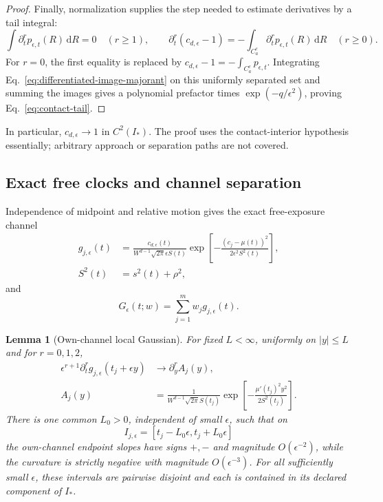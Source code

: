 \documentclass[aps,physrev,onecolumn,amsmath,amssymb,longbibliography]{revtex4-2}
\newcommand{\dd}{\mathrm d}
\newtheorem{lemma}[theorem]{Lemma}
\begin{document}
\begin{proof}
Finally, normalization supplies the step needed to estimate derivatives by a
tail integral:
\begin{equation}
 \int\partial_t^rp_{\epsilon,t}(R)\,\dd R=0\quad(r\ge1),
 \qquad
 \partial_t^r(c_{d,\epsilon}-1)
 =-\int_{C_a^c}\partial_t^rp_{\epsilon,t}(R)\,\dd R
 \quad(r\ge0).
 \label{eq:contact-tail-normalization}
\end{equation}
For \(r=0\), the first equality is replaced by
\(c_{d,\epsilon}-1=-\int_{C_a^c}p_{\epsilon,t}\).
Integrating Eq.~\eqref{eq:differentiated-image-majorant} on this uniformly
separated set and summing the images gives a polynomial prefactor times
\(\exp(-q/\epsilon^2)\), proving Eq.~\eqref{eq:contact-tail}.
\end{proof}

In particular, \(c_{d,\epsilon}\to1\) in \(C^2(I_*)\).  The proof uses the
contact-interior hypothesis essentially; arbitrary approach or separation
paths are not covered.

\subsection{Exact free clocks and channel separation}

Independence of midpoint and relative motion gives the exact free-exposure
channel
\begin{align}
 g_{j,\epsilon}(t)
 &=\frac{c_{d,\epsilon}(t)}
 {W^{d-1}\sqrt{2\pi}\epsilon S(t)}
 \exp\!\left[-\frac{(c_j-\mu(t))^2}{2\epsilon^2S^2(t)}\right],
 \label{eq:exact-free-clock}\\
 S^2(t)&=s^2(t)+\rho^2,
 \label{eq:convolved-variance}
\end{align}
and
\begin{equation}
 G_\epsilon(t;w)=\sum_{j=1}^mw_jg_{j,\epsilon}(t).
 \label{eq:direct-free-mixture}
\end{equation}

\begin{lemma}[Own-channel local Gaussian]
\label{lem:own-channel}
For fixed \(L<\infty\), uniformly on \(|y|\le L\) and for \(r=0,1,2\),
\begin{align}
 \epsilon^{r+1}\partial_t^rg_{j,\epsilon}(t_j+\epsilon y)
 &\longrightarrow \partial_y^rA_j(y),
 \label{eq:own-channel-convergence}\\
 A_j(y)&=
 \frac{1}{W^{d-1}\sqrt{2\pi}S(t_j)}
 \exp\!\left[-\frac{\mu'(t_j)^2y^2}{2S^2(t_j)}\right].
 \label{eq:own-channel-limit}
\end{align}
There is one common \(L_0>0\), independent of small \(\epsilon\), such that
on
\begin{equation}
 I_{j,\epsilon}=
 [t_j-L_0\epsilon,t_j+L_0\epsilon]
 \label{eq:local-intervals}
\end{equation}
the own-channel endpoint slopes have signs \(+,-\) and magnitude
\(O(\epsilon^{-2})\), while the curvature is strictly negative with magnitude
\(O(\epsilon^{-3})\).  For all sufficiently small \(\epsilon\), these
intervals are pairwise disjoint and each is contained in its declared
component of \(I_*\).
\end{lemma}
\end{document}
